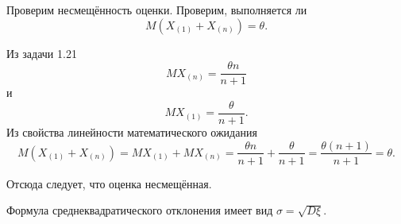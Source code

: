 \begin{enumerate}[label=\alph*)]
  Проверим несмещённость оценки.
  Проверим, выполняется ли
  $$M \left( X_{ \left( 1 \right) } + X_{ \left( n \right) } \right) =
    \theta.$$

  Из задачи 1.21
  $$MX_{ \left( n \right) } =
    \frac{ \theta n}{n + 1}$$
  и
  $$MX_{ \left( 1 \right) } =
    \frac{ \theta }{n + 1}.$$
  Из свойства линейности математического ожидания
  $$M \left( X_{ \left( 1 \right) } + X_{ \left( n \right) } \right) =
    MX_{ \left( 1 \right) } + MX_{ \left( n \right) } =
    \frac{ \theta n}{n + 1} + \frac{ \theta }{n + 1} =
    \frac{ \theta \left( n + 1 \right) }{n + 1} =
    \theta.$$

  Отсюда следует, что оценка несмещённая.

  Формула среднеквадратического отклонения имеет вид $ \sigma = \sqrt{D \xi }$.


\end{enumerate}
